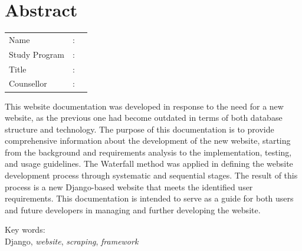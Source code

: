 %
%
%

\chapter*{Abstract}

\vspace*{0.2cm}
{
	\setlength{\parindent}{0pt}
	
	\begin{tabular}{@{}l l p{10cm}}
		Name&: & \penulis \\
		Study Program&: & \program \\
		Title&: & \judulInggris \\
		Counsellor&: & \pembimbing \\
	\end{tabular}

	\bigskip
	\bigskip

	This website documentation was developed in response to the need for a new website, as the previous one had become outdated in terms of both database structure and technology. The purpose of this documentation is to provide comprehensive information about the development of the new website, starting from the background and requirements analysis to the implementation, testing, and usage guidelines. The Waterfall method was applied in defining the website development process through systematic and sequential stages. The result of this process is a new Django-based website that meets the identified user requirements. This documentation is intended to serve as a guide for both users and future developers in managing and further developing the website.

	\bigskip

	Key words:\\
	Django, \textit{website}, \textit{scraping}, \textit{framework}
}

\newpage